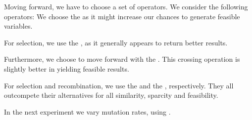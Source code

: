\documentclass[./../../paper.tex]{subfiles}
\begin{document}

Moving forward, we have to choose a set of operators. We consider the following operators: We choose the  as it might increase our chances to generate feasible variables.

For selection, we use the , as it generally appears to return better results.

Furthermore, we choose to move forward with the . This crossing operation is slightly better in yielding feasible results.

For selection and recombination, we use the  and the , respectively. They all outcompete their alternatives for all similarity, sparcity and feasibility.

In the next experiment we vary mutation rates, using \ModelEVOFSR.
\end{document}
